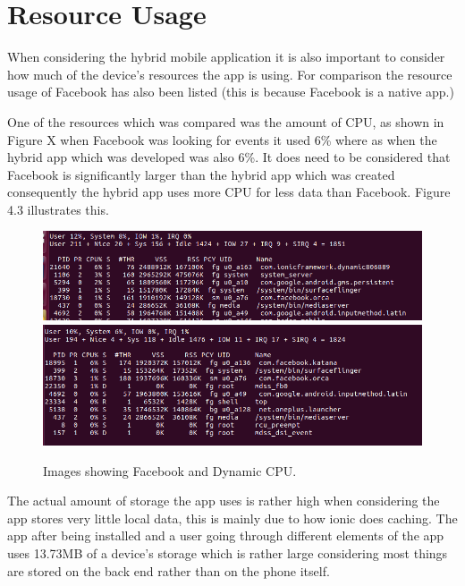  \section{Resource Usage}
 When considering the hybrid mobile application it is also important to consider how much of the device's resources the app is using. For comparison the resource usage of Facebook has also been listed (this is because Facebook is a native app.)

 One of the resources which was compared was the amount of CPU, as shown in Figure X when Facebook was looking for events it used 6\% where as when the hybrid app which was developed was also 6\%. It does need to be considered that Facebook is significantly larger than the hybrid app which was created consequently the hybrid app uses more CPU for less data than Facebook. Figure 4.3 illustrates this.

\begin{figure}[H]
\includegraphics[scale=0.45]{images/ram2}
\includegraphics[scale=0.45]{images/ram3}
\caption{Images showing Facebook and Dynamic CPU.}
\end{figure}

The actual amount of storage the app uses is rather high when considering the app stores very little local data, this is mainly due to how ionic does caching. The app after being installed and a user going through different elements of the app uses 13.73MB of a device's storage which is rather large considering most things are stored on the back end rather than on the phone itself. 

